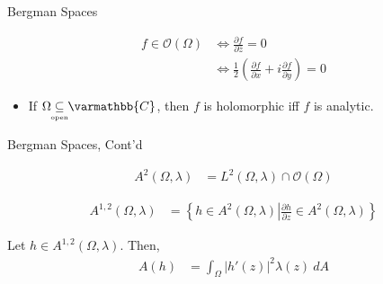 \documentclass{beamer}
\newcommand{\C}{\mathbb{C}}
\newcommand{\mco}{\mathcal{O}} %
\newcommand{\set}[1]{\left\{#1\right\}}
\renewcommand*{\mathbb}[1]{\varmathbb{#1}}
\begin{document}
\begin{frame}{Bergman Spaces}
  \begin{definition}[$\mco\left(\Omega\right)$]
    \begin{align*}
      f\in \mco\left(\Omega\right) &\Longleftrightarrow \frac{\partial f}{\partial \overline{z}} = 0\\
                                   &\Longleftrightarrow \frac{1}{2}\left(\frac{\partial f}{\partial x} + i\frac{\partial f}{\partial y}\right) = 0
    \end{align*}
  \end{definition}
  \begin{itemize}
    \item If $\displaystyle \Omega \underset{\clap{\tiny open}}{\subseteq} \C$, then $f$ is holomorphic iff $f$ is analytic.
  \end{itemize}
\end{frame}
\begin{frame}{Bergman Spaces, Cont'd}
  \begin{definition}
    \begin{align*}
      A^{2}\left(\Omega,\lambda\right) &= L^{2}\left(\Omega,\lambda\right) \cap \mco\left(\Omega\right)
    \end{align*}
  \end{definition}
  \begin{definition}
    \begin{align*}
      A^{1,2}\left(\Omega,\lambda\right) &= \set{h\in A^{2}\left(\Omega,\lambda\right)\left|\frac{\partial h}{\partial z}\in A^{2}\left(\Omega,\lambda\right)\right.}
    \end{align*}
  \end{definition}
  \begin{definition}
    Let $h\in A^{1,2}\left(\Omega,\lambda\right)$. Then,
    \begin{align*}
      A(h) &= \int_{\Omega}^{} \left\vert h'(z) \right\vert^2\lambda(z)\:dA
    \end{align*}
  \end{definition}
\end{frame}
\end{document}
